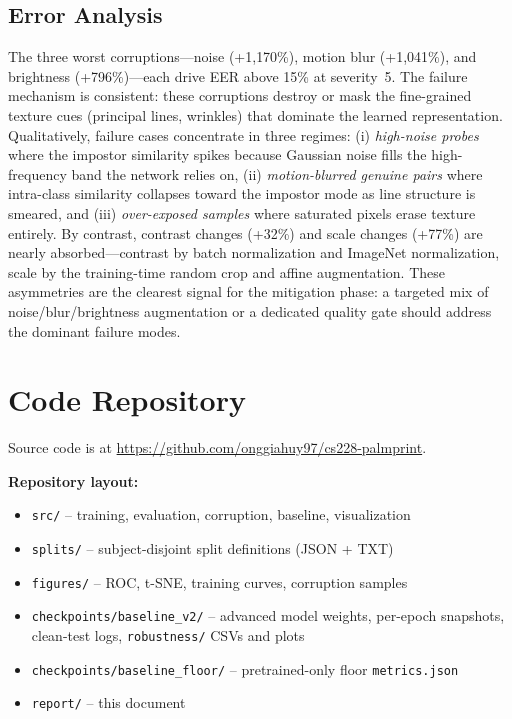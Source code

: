 \documentclass[conference]{IEEEtran}
\begin{document}
\subsection{Error Analysis}
The three worst corruptions---noise (+1{,}170\%), motion blur (+1{,}041\%), and brightness (+796\%)---each drive EER above 15\% at severity~5. The failure mechanism is consistent: these corruptions destroy or mask the fine-grained texture cues (principal lines, wrinkles) that dominate the learned representation. Qualitatively, failure cases concentrate in three regimes: (i) \emph{high-noise probes} where the impostor similarity spikes because Gaussian noise fills the high-frequency band the network relies on, (ii) \emph{motion-blurred genuine pairs} where intra-class similarity collapses toward the impostor mode as line structure is smeared, and (iii) \emph{over-exposed samples} where saturated pixels erase texture entirely. By contrast, contrast changes (+32\%) and scale changes (+77\%) are nearly absorbed---contrast by batch normalization and ImageNet normalization, scale by the training-time random crop and affine augmentation. These asymmetries are the clearest signal for the mitigation phase: a targeted mix of noise/blur/brightness augmentation or a dedicated quality gate should address the dominant failure modes.

\section{Code Repository}

Source code is at \url{https://github.com/onggiahuy97/cs228-palmprint}.

\medskip
\noindent\textbf{Repository layout:}
\begin{itemize}
    \item \texttt{src/} -- training, evaluation, corruption, baseline, visualization
    \item \texttt{splits/} -- subject-disjoint split definitions (JSON + TXT)
    \item \texttt{figures/} -- ROC, t-SNE, training curves, corruption samples
    \item \texttt{checkpoints/baseline\_v2/} -- advanced model weights, per-epoch snapshots, clean-test logs, \texttt{robustness/} CSVs and plots
    \item \texttt{checkpoints/baseline\_floor/} -- pretrained-only floor \texttt{metrics.json}
    \item \texttt{report/} -- this document
\end{itemize}
\end{document}
